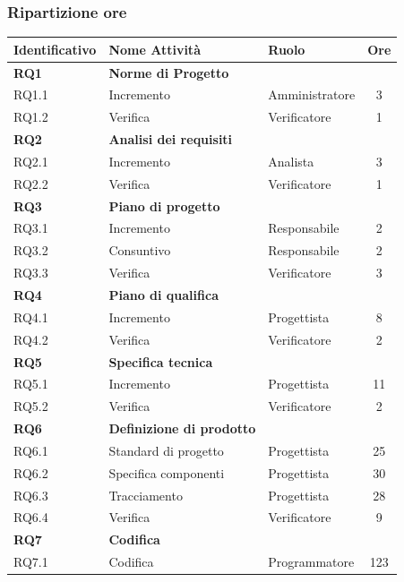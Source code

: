 \subsubsection{Ripartizione ore}
\bgroup
\begin{longtable}{|l|l|l|c|}
	\endfirsthead
	\hline
	\textbf{Identificativo} &
	\textbf{Nome Attività} &
	\textbf{Ruolo} &
	\textbf{Ore}\\
	\endhead
	\hline
	\textbf{RQ1} & \textbf{Norme di Progetto} &  &  \\
	\hline
	{RQ1.1} & {Incremento} & Amministratore  & 3\\
	\hline
	{RQ1.2} & {Verifica} & Verificatore & 1 \\
	\hline
	\textbf{RQ2} & \textbf{Analisi dei requisiti}  & & \\
	\hline
	{RQ2.1} & {Incremento} & Analista &  3\\
	\hline
	{RQ2.2} & {Verifica} & Verificatore & 1 \\
	\hline
	\textbf{RQ3} & \textbf{Piano di progetto} & &  \\
	\hline
	{RQ3.1} & {Incremento} & Responsabile  &  2\\
	\hline
	{RQ3.2} & {Consuntivo} & Responsabile  &  2\\
	\hline
	{RQ3.3} & {Verifica} & Verificatore  &  3\\
	\hline
	\textbf{RQ4} & \textbf{Piano di qualifica} & &  \\
	\hline
	{RQ4.1} & {Incremento} & Progettista  & 8\\
	\hline
	{RQ4.2} & {Verifica} & Verificatore & 2 \\
	\hline
	\textbf{RQ5} & \textbf{Specifica tecnica} & &  \\
	\hline
	{RQ5.1} & {Incremento} & Progettista  & 11\\
	\hline
	{RQ5.2} & {Verifica} & Verificatore & 2 \\
	\hline
	\textbf{RQ6} & \textbf{Definizione di prodotto} & &  \\
	\hline
	{RQ6.1} & {Standard di progetto} & Progettista  & 25\\
	\hline
	{RQ6.2} & {Specifica componenti} & Progettista & 30 \\
	\hline
	{RQ6.3} & {Tracciamento} & Progettista & 28 \\
	\hline
	{RQ6.4} & {Verifica} & Verificatore & 9 \\
	\hline
	\textbf{RQ7} & \textbf{Codifica} & &  \\
	\hline
	{RQ7.1} & {Codifica} & Programmatore  & 123\\

\end{longtable}
